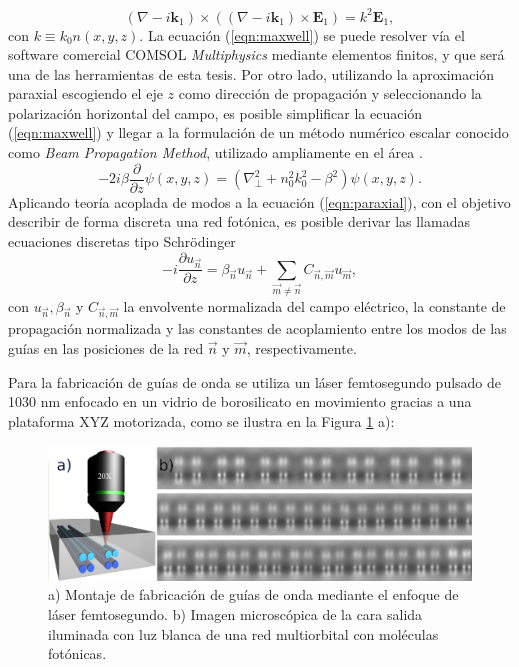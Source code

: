 \documentclass{article}
\begin{document}
\begin{equation}
	(\nabla-i\textbf{k}_1)\times((\nabla-i\textbf{k}_1)\times \textbf{E}_1) = k^2 \textbf{E}_1,
	 \label{eqn:maxwell}
\end{equation}
con $k \equiv k_0 n(x,y,z)$.
La ecuación (\ref{eqn:maxwell}) se puede resolver vía el software comercial COMSOL \textit{Multiphysics} mediante elementos finitos, y que será una de las herramientas de esta tesis. Por otro lado, utilizando la aproximación paraxial escogiendo el eje $z$  como dirección de propagación y seleccionando la polarización horizontal del campo, es posible simplificar la ecuación (\ref{eqn:maxwell}) y llegar a la formulación de un método numérico escalar conocido como \textit{Beam Propagation Method}, utilizado ampliamente en el área \cite{bics, interorbital, OAMCaging, vortex, bpm}.
\begin{equation}
	-2i\beta\frac{\partial}{\partial z}\psi(x,y,z) = \left(\nabla_\perp^2 + n_0^2 k_0^2 - \beta^2\right) \psi (x,y,z). \label{eqn:paraxial}
\end{equation}
Aplicando teoría acoplada de modos \cite{coupledmodetheory} a la ecuación (\ref{eqn:paraxial}), con el objetivo describir de forma discreta una red fotónica, es posible derivar las llamadas ecuaciones discretas tipo Schrödinger \cite{discretesolitons, artificialFB, FBdynamics}
\begin{equation}
	-i\frac{\partial u_{\vec{n}} }{\partial z} = \beta_{\vec{n}}u_{\vec{n}} + \sum_{\vec{m}\neq\vec{n}} C_{\vec{n},\vec{m}}u_{\vec{m}}, \label{eqn:CMT}
\end{equation}
con $u_{\vec{n}}, \beta_{\vec{n}}$ y $C_{\vec{n}, \vec{m}}$ la envolvente normalizada del campo eléctrico, la constante de propagación normalizada y las constantes de acoplamiento entre los modos de las guías en las posiciones de la red $\vec{n}$ y $\vec{m}$, respectivamente.


Para la fabricación de guías de onda se utiliza un láser femtosegundo pulsado de 1030 nm enfocado en un vidrio de borosilicato en movimiento gracias a una plataforma XYZ motorizada, como se ilustra en la Figura \ref{fig:femtosetup} a): 

\begin{figure}[H]
	\centering
	\includegraphics[width=0.9\linewidth]{./media/femtosetup.png}
	\caption{a) Montaje de fabricación de guías de onda mediante el enfoque de láser femtosegundo. b) Imagen microscópica de la cara salida iluminada con luz blanca de una red multiorbital con moléculas fotónicas. \label{fig:femtosetup}}
\end{figure}
\end{document}
